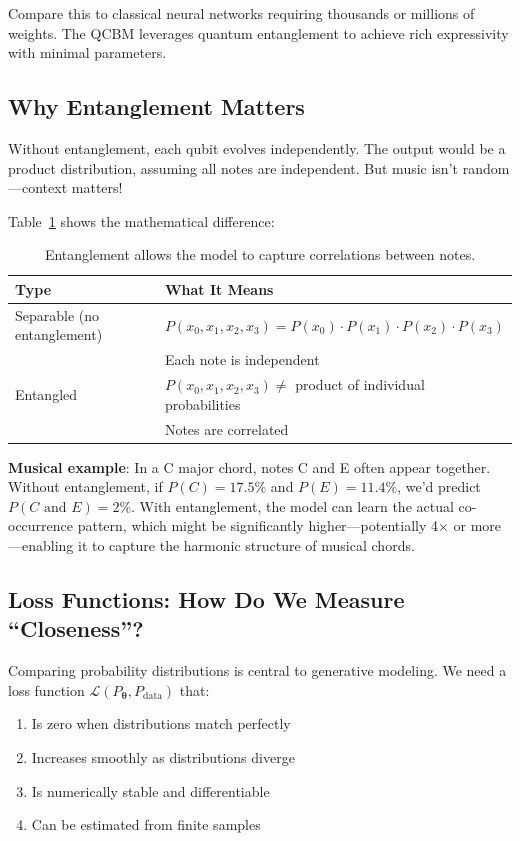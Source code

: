 \documentclass[11pt,a4paper]{article}
\begin{document}
Compare this to classical neural networks requiring thousands or millions of weights. The QCBM leverages quantum entanglement to achieve rich expressivity with minimal parameters.
\subsection{Why Entanglement Matters}

Without entanglement, each qubit evolves independently. The output would be a product distribution, assuming all notes are independent. But music isn't random—context matters!

Table~\ref{tab:entanglement_comparison} shows the mathematical difference:

\begin{table}[H]
\centering
\begin{tabular}{lp{10cm}}
\toprule
\textbf{Type} & \textbf{What It Means} \\
\midrule
Separable (no entanglement) & $P(x_0, x_1, x_2, x_3) = P(x_0) \cdot P(x_1) \cdot P(x_2) \cdot P(x_3)$ \\
 & Each note is independent \\
\addlinespace
Entangled & $P(x_0, x_1, x_2, x_3) \neq$ product of individual probabilities \\
 & Notes are correlated \\
\bottomrule
\end{tabular}
\caption{Entanglement allows the model to capture correlations between notes.}
\label{tab:entanglement_comparison}
\end{table}

\textbf{Musical example}: In a C major chord, notes C and E often appear together. Without entanglement, if $P(C) = 17.5\%$ and $P(E) = 11.4\%$, we'd predict $P(C \text{ and } E) = 2\%$. With entanglement, the model can learn the actual co-occurrence pattern, which might be significantly higher—potentially 4× or more—enabling it to capture the harmonic structure of musical chords.

\subsection{Loss Functions: How Do We Measure ``Closeness''?}

Comparing probability distributions is central to generative modeling. We need a loss function $\mathcal{L}(P_{\boldsymbol{\theta}}, P_{\text{data}})$ that:
\begin{enumerate}
    \item Is zero when distributions match perfectly
    \item Increases smoothly as distributions diverge
    \item Is numerically stable and differentiable
    \item Can be estimated from finite samples
\end{enumerate}
\end{document}
